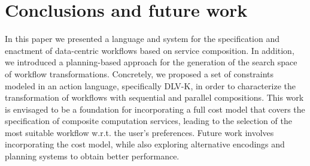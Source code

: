 
\section{Conclusions and future work} \label{sec:conclusions}

In this paper we presented a language and system for the specification and enactment of data-centric workflows based on service composition. In addition, we introduced a planning-based approach for the generation of the search space of workflow transformations. Concretely, we proposed a set of constraints modeled in an action language, specifically DLV-K, in order to characterize the transformation of workflows with sequential and parallel compositions. This work is envisaged to be a foundation for incorporating a full cost model that covers the specification of composite computation services, leading to the selection of the most suitable workflow w.r.t. the user's preferences. Future work involves incorporating the cost model, while also exploring alternative encodings and planning systems to obtain better performance.
